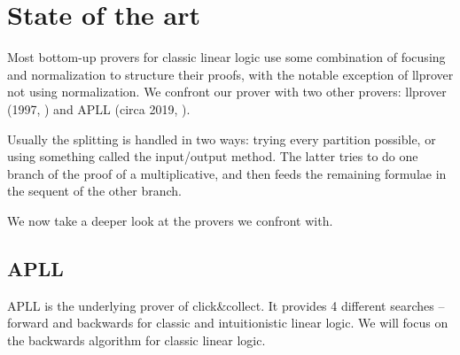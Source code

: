 \chapter{State of the art}\label{chapter:state of the art}
Most bottom-up provers for classic linear logic use some combination of focusing and normalization to structure their proofs, with the notable exception of llprover not using normalization.	%
We confront our prover with two other provers: llprover (1997, %
) and APLL (circa 2019, %
).

Usually the splitting is handled in two ways: trying every partition possible, or using something called the input/output %
method. The latter tries to do one branch of the proof of a multiplicative, and then feeds the remaining formulae in the sequent of the other branch.

We now take a deeper look at the provers we confront with.

\section{APLL}\label{sec:apll}
APLL is the underlying prover of click\&collect. %
It provides 4 different searches -- forward and backwards for classic and intuitionistic linear logic. 
We will focus on the backwards algorithm for classic linear logic.


